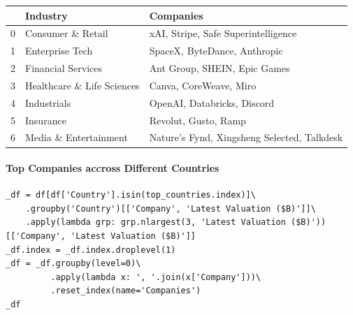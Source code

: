 \documentclass[a4paper,12pt]{article}
\begin{document}
\begin{table}[htbp]
\label{}
\centering
\begin{tabular}{rll}
 & Industry & Companies\\
\hline
0 & Consumer \& Retail & xAI, Stripe, Safe Superintelligence\\
1 & Enterprise Tech & SpaceX, ByteDance, Anthropic\\
2 & Financial Services & Ant Group, SHEIN, Epic Games\\
3 & Healthcare \& Life Sciences & Canva, CoreWeave, Miro\\
4 & Industrials & OpenAI, Databricks, Discord\\
5 & Insurance & Revolut, Gusto, Ramp\\
6 & Media \& Entertainment & Nature's Fynd, Xingsheng Selected, Talkdesk\\
\end{tabular}
\end{table}
\newpage
\paragraph{Top Companies accross Different Countries}
\label{sec:orgbeca2ba}
\begin{verbatim}
_df = df[df['Country'].isin(top_countries.index)]\
    .groupby('Country')[['Company', 'Latest Valuation ($B)']]\
    .apply(lambda grp: grp.nlargest(3, 'Latest Valuation ($B)'))[['Company', 'Latest Valuation ($B)']]
_df.index = _df.index.droplevel(1)
_df = _df.groupby(level=0)\
         .apply(lambda x: ', '.join(x['Company']))\
         .reset_index(name='Companies')
_df
\end{verbatim}
\end{document}
